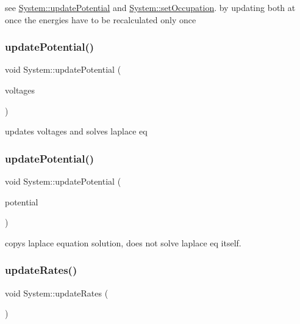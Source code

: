 see \hyperlink{classSystem_a398b2539956dc5c456dff4bbe24eb1ba}{System\+::update\+Potential} and \hyperlink{classSystem_ac449110fcd692cdec9987730635179df}{System\+::set\+Occupation}. by updating both at once the energies have to be recalculated only once \mbox{\label{classSystem_a398b2539956dc5c456dff4bbe24eb1ba}} 
\subsubsection{\texorpdfstring{update\+Potential()}{updatePotential()}\hspace{0.1cm}{\footnotesize\ttfamily [1/2]}}
{\footnotesize\ttfamily void System\+::update\+Potential (\begin{DoxyParamCaption}\item[{std\+::vector$<$ double $>$ const \&}]{voltages }\end{DoxyParamCaption})}

updates voltages and solves laplace eq \mbox{\label{classSystem_a3d2943951e8fd2aece2c27065ed16e3d}} 
\subsubsection{\texorpdfstring{update\+Potential()}{updatePotential()}\hspace{0.1cm}{\footnotesize\ttfamily [2/2]}}
{\footnotesize\ttfamily void System\+::update\+Potential (\begin{DoxyParamCaption}\item[{mfem\+::\+Grid\+Function const \&}]{potential }\end{DoxyParamCaption})}

copys laplace equation solution, does not solve laplace eq itself. \mbox{\label{classSystem_a1f50240f4eecb60f8302307e6df814af}} 
\subsubsection{\texorpdfstring{update\+Rates()}{updateRates()}}
{\footnotesize\ttfamily void System\+::update\+Rates (\begin{DoxyParamCaption}{ }\end{DoxyParamCaption})\hspace{0.3cm}{\ttfamily [private]}}

